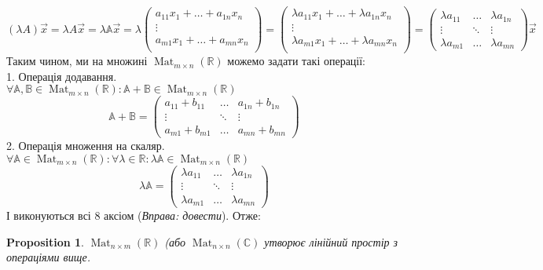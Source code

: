 \documentclass[a4paper, 10pt]{article}
\theoremstyle{theoremdd}
\newtheorem{proposition}[theorem]{Proposition}
\DeclareMathOperator{\Mat}{Mat}
\begin{document}
	$(\lambda A)\vec{x} = \lambda A \vec{x} = \lambda \mathbb{A} \vec{x} = \lambda \begin{pmatrix}
	a_{11}x_1 + \dots + a_{1n} x_n \\
	\vdots \\
	a_{m1}x_1 + \dots + a_{mn} x_n \\
	\end{pmatrix}
	= \begin{pmatrix}
	\lambda a_{11}x_1 + \dots + \lambda a_{1n} x_n \\
	\vdots \\
	\lambda a_{m1} x_1 + \dots + \lambda a_{mn} x_n \\
	\end{pmatrix} = \begin{pmatrix}
	\lambda a_{11} & \dots & \lambda a_{1n}\\
	\vdots & \ddots & \vdots \\
	\lambda a_{m1} & \dots & \lambda a_{mn}
	\end{pmatrix} \vec{x}$
	\bigskip \\
	Таким чином, ми на множині $\Mat_{m \times n}(\mathbb{R})$ можемо задати такі операції:\\
	1. Операція додавання.\\
	$\forall \mathbb{A}, \mathbb{B} \in \Mat_{m \times n}(\mathbb{R}): \mathbb{A} + \mathbb{B} \in \Mat_{m \times n}(\mathbb{R})$\\
	$$\mathbb{A} + \mathbb{B} = \begin{pmatrix}
	a_{11} + b_{11} & \dots & a_{1n} + b_{1n} \\
	\vdots & \ddots & \vdots \\
	a_{m1} + b_{m1} & \dots & a_{mn} + b_{mn}
	\end{pmatrix}$$
	2. Операція множення на скаляр.\\
	$\forall \mathbb{A} \in \Mat_{m \times n}(\mathbb{R}): \forall \lambda \in \mathbb{R}: \lambda \mathbb{A} \in \Mat_{m \times n}(\mathbb{R})$\\
	$$\lambda \mathbb{A} = \begin{pmatrix}
	\lambda a_{11} & \dots & \lambda a_{1n}\\
	\vdots & \ddots & \vdots \\
	\lambda a_{m1} & \dots & \lambda a_{mn}
	\end{pmatrix}$$
	І виконуються всі 8 аксіом (\textit{Вправа: довести}). Отже:
	
	\begin{proposition}
	$\Mat_{n \times m}(\mathbb{R})$ (або $\Mat_{n \times n}(\mathbb{C})$ утворює лінійний простір з операціями вище.
	\end{proposition}
	
\end{document}
